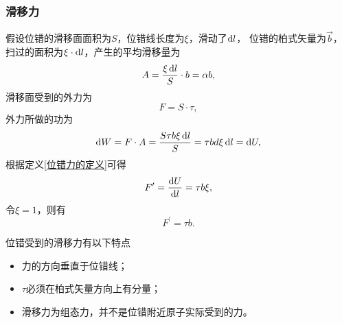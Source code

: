                 \subsubsection{滑移力}
                    假设位错的滑移面面积为$S$，位错线长度为$\xi$，滑动了$\mathop{}\!\mathrm{d} l$，
                    位错的柏式矢量为$\vec{b}$，扫过的面积为$\xi\cdot\mathop{}\!\mathrm{d} l$，产生的平均滑移量为
                    \begin{equation}
                        A=\frac{\xi\mathop{}\!\mathrm{d} l}{S}\cdot b=\alpha b,
                    \end{equation}
                    滑移面受到的外力为
                    \begin{equation}
                        F=S\cdot\tau,
                    \end{equation}
                    外力所做的功为
                    \begin{equation}
                        \mathop{}\!\mathrm{d} W=F\cdot A=\frac{S\tau b\xi\mathop{}\!\mathrm{d} l}{S}=\tau bd\xi\mathop{}\!\mathrm{d} l=\mathop{}\!\mathrm{d} U,
                    \end{equation}
                    根据定义\autoref{位错力的定义}可得
                    \begin{equation}
                        F^{\prime}=\frac{\mathop{}\!\mathrm{d} U}{\mathop{}\!\mathrm{d} l}=\tau b\xi,
                    \end{equation}
                    令$\xi=1$，则有
                    \begin{equation}
                        F^{\prime}=\tau b.
                    \end{equation}

                    位错受到的滑移力有以下特点
                    \begin{itemize}
                        \item 力的方向垂直于位错线；
                        \item $\tau$必须在柏式矢量方向上有分量；
                        \item 滑移力为组态力，并不是位错附近原子实际受到的力。
                    \end{itemize}

